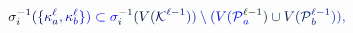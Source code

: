 \documentclass[12pt]{article}
\begin{document}
\makeatletter
\renewcommand*{\@textcolor}[3]{%
  \protect\leavevmode
  \begingroup
    \color#1{#2}#3%
  \endgroup
}
\makeatother
\begin{displaymath}
\mathcolor[RGB]{0,0,15}{\sigma} _ { \mathcolor[RGB]{0,0,30}{i} } ^ { \mathcolor[RGB]{0,0,45}{-} \mathcolor[RGB]{0,0,60}{1} } \mathcolor[RGB]{0,0,75}{(} \mathcolor[RGB]{0,0,90}{\{} \mathcolor[RGB]{0,0,105}{\kappa} _ { \mathcolor[RGB]{0,0,120}{a} } ^ { \mathcolor[RGB]{0,0,135}{\ell} } \mathcolor[RGB]{0,0,150}{,} \mathcolor[RGB]{0,0,165}{\kappa} _ { \mathcolor[RGB]{0,0,180}{b} } ^ { \mathcolor[RGB]{0,0,195}{\ell} } \mathcolor[RGB]{0,0,210}{\}} \mathcolor[RGB]{0,0,225}{)} \mathcolor[RGB]{0,0,240}{\subset} \mathcolor[RGB]{0,0,255}{\sigma} _ { \mathcolor[RGB]{0,15,0}{i} } ^ { \mathcolor[RGB]{0,15,15}{-} \mathcolor[RGB]{0,15,30}{1} } \mathcolor[RGB]{0,15,45}{(} \mathcolor[RGB]{0,15,60}{V} \mathcolor[RGB]{0,15,75}{(} \mathcal { \mathcolor[RGB]{0,15,90}{K} } ^ { \mathcolor[RGB]{0,15,105}{\ell} \mathcolor[RGB]{0,15,120}{-} \mathcolor[RGB]{0,15,135}{1} } \mathcolor[RGB]{0,15,150}{)} \mathcolor[RGB]{0,15,165}{)} \mathcolor[RGB]{0,15,180}{\setminus} \mathcolor[RGB]{0,15,195}{(} \mathcolor[RGB]{0,15,210}{V} \mathcolor[RGB]{0,15,225}{(} \mathcal { \mathcolor[RGB]{0,15,240}{P} } _ { \mathcolor[RGB]{0,15,255}{a} } ^ { \mathcolor[RGB]{0,30,0}{\ell} \mathcolor[RGB]{0,30,15}{-} \mathcolor[RGB]{0,30,30}{1} } \mathcolor[RGB]{0,30,45}{)} \mathcolor[RGB]{0,30,60}{\cup} \mathcolor[RGB]{0,30,75}{V} \mathcolor[RGB]{0,30,90}{(} \mathcal { \mathcolor[RGB]{0,30,105}{P} } _ { \mathcolor[RGB]{0,30,120}{b} } ^ { \mathcolor[RGB]{0,30,135}{\ell} \mathcolor[RGB]{0,30,150}{-} \mathcolor[RGB]{0,30,165}{1} } \mathcolor[RGB]{0,30,180}{)} \mathcolor[RGB]{0,30,195}{)} \mathcolor[RGB]{0,30,210}{,}
\end{displaymath}
\end{document}
